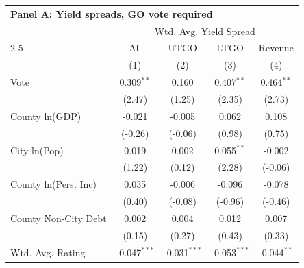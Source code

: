 \begingroup
\centering
\begin{tabular*}{\textwidth}{@{\extracolsep{\fill}}lcccc}
\multicolumn{5}{l}{\textbf{Panel A: Yield spreads, GO vote required}}\\

\addlinespace
   \toprule
                               & \multicolumn{4}{c}{Wtd. Avg. Yield Spread}\\  
   \cmidrule(lr){2-5}
                               & All                    & UTGO                          & LTGO                          & Revenue \\   
                               & (1)                    & (2)                           & (3)                           & (4)\\  
   \midrule 
   Vote                        & 0.309$^{**}$           & 0.160                         & 0.407$^{**}$                  & 0.464$^{**}$\\   
                               & (2.47)                & (1.25)                       & (2.35)                       & (2.73)\\   
   County ln(GDP)              & -0.021                 & -0.005                        & 0.062                         & 0.108\\   
                               & (-0.26)               & (-0.06)                      & (0.98)                       & (0.75)\\   
   City ln(Pop)                & 0.019                  & 0.002                         & 0.055$^{**}$                  & -0.002\\   
                               & (1.22)                & (0.12)                       & (2.28)                       & (-0.06)\\   
   County ln(Pers. Inc)        & 0.035                  & -0.006                        & -0.096                        & -0.078\\   
                               & (0.40)                & (-0.08)                      & (-0.96)                      & (-0.46)\\   
   County Non-City Debt        & 0.002                  & 0.004                         & 0.012                         & 0.007\\   
                               & (0.15)                & (0.27)                       & (0.43)                       & (0.33)\\   
   Wtd. Avg. Rating            & -0.047$^{***}$         & -0.031$^{***}$                & -0.053$^{***}$                & -0.044$^{**}$\\   

\end{tabular*}
